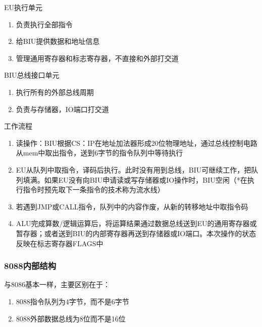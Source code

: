 EU执行单元
\begin{enumerate}
    \item 负责执行全部指令
    \item 给BIU提供数据和地址信息
    \item 管理通用寄存器和标志寄存器，不直接和外部打交道
\end{enumerate}
BIU总线接口单元
\begin{enumerate}
    \item 执行所有的外部总线周期
    \item 负责与存储器，IO端口打交道
\end{enumerate}
工作流程
\begin{enumerate}
    \item 读操作：BIU根据CS：IP在地址加法器形成20位物理地址，通过总线控制电路从mem中取出指令，送到6字节的指令队列中等待执行
    \item EU从队列中取指令，译码后执行。此时没有用到总线，BIU可继续工作，把队列填满。如果EU没有向BIU申请读或写存储器或IO操作时，BIU空闲（*在执行指令时预先取下一条指令的技术称为流水线）
    \item 若遇到JMP或CALL指令，队列中的内容作废，从新的转移地址中取指令码
    \item ALU完成算数/逻辑运算后，将运算结果通过数据总线送到EU的通用寄存器或暂存器；或者送到BIU的内部寄存器再送到存储器或IO端口。本次操作的状态反映在标志寄存器FLAGS中
\end{enumerate}
\subsubsection{8088内部结构}
与8086基本一样，主要区别在于：
\begin{enumerate}
    \item 8088指令队列为4字节，而不是6字节
    \item 8088外部数据总线为8位而不是16位
\end{enumerate}

